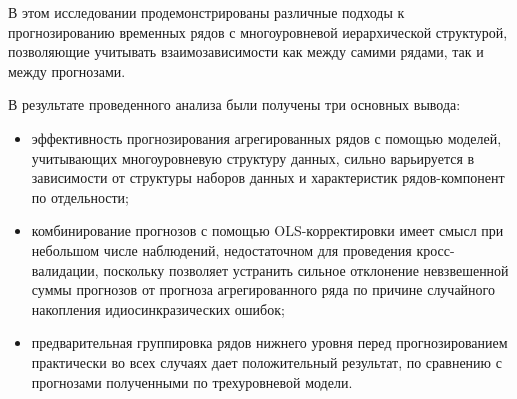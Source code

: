 \documentclass[12pt,a4paper, oneside]{extreport}
\begin{document}
В этом исследовании продемонстрированы различные подходы к прогнозированию временных рядов с многоуровневой иерархической структурой, позволяющие учитывать взаимозависимости как между самими рядами, так и между  прогнозами. 



В результате проведенного анализа были получены три основных вывода: 

\begin{itemize}
	\item эффективность   прогнозирования  агрегированных рядов с помощью моделей, учитывающих многоуровневую структуру данных,  сильно варьируется в зависимости от структуры наборов данных и характеристик рядов-компонент   по отдельности;
	\item комбинирование прогнозов с помощью OLS-корректировки  имеет смысл при небольшом числе наблюдений, недостаточном для проведения кросс-валидации, поскольку позволяет устранить сильное отклонение невзвешенной суммы прогнозов от прогноза агрегированного ряда по причине случайного накопления идиосинкразических ошибок;
	\item     предварительная группировка рядов нижнего уровня перед прогнозированием практически во всех случаях дает положительный результат, по сравнению с прогнозами полученными по трехуровневой модели. 
\end{itemize}













\end{document}
